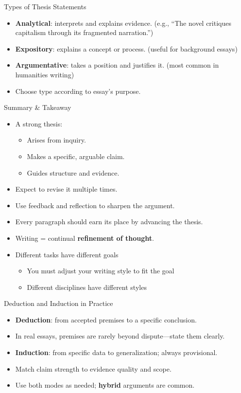 \documentclass[aspectratio=169]{beamer}
\begin{document}
\begin{frame}{Types of Thesis Statements}
\begin{itemize}
  \item \textbf{Analytical}: interprets and explains evidence.  
        (e.g., “The novel critiques capitalism through its fragmented narration.”)
  \item \textbf{Expository}: explains a concept or process.  
        (useful for background essays)
  \item \textbf{Argumentative}: takes a position and justifies it.  
        (most common in humanities writing)
  \item Choose type according to essay’s purpose.
\end{itemize}
\end{frame}

\begin{frame}{Summary \& Takeaway}
\begin{itemize}
  \item A strong thesis:
    \begin{itemize}
      \item Arises from inquiry.
      \item Makes a specific, arguable claim.
      \item Guides structure and evidence.
    \end{itemize}
  \item Expect to revise it multiple times.
  \item Use feedback and reflection to sharpen the argument.
  \item Every paragraph should earn its place by advancing the thesis.
  \item Writing = continual \textbf{refinement of thought}.
  \item Different tasks have different goals
    \begin{itemize}
    \item You must adjust your writing style to fit the goal
    \item Different disciplines have different styles
    \end{itemize}
\end{itemize}
\end{frame}

\begin{frame}{Deduction and Induction in Practice}
\begin{itemize}
  \item \textbf{Deduction}: from accepted premises to a specific conclusion.
  \item[$\Rightarrow$] In real essays, premises are rarely beyond dispute—state them clearly.
  \item \textbf{Induction}: from specific data to generalization; always provisional.
  \item[$\Rightarrow$] Match claim strength to evidence quality and scope.
  \item Use both modes as needed; \textbf{hybrid} arguments are common.
\end{itemize}
\end{frame}
\end{document}
